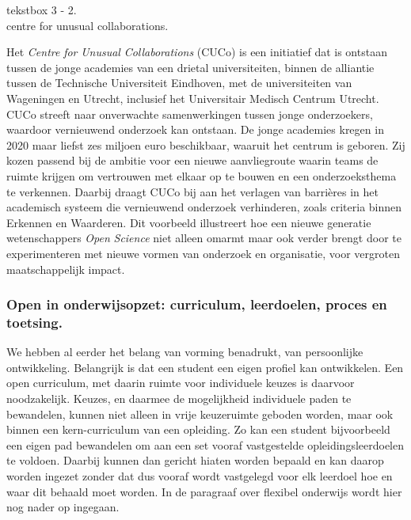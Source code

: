 \documentclass[empirical, authordate, ]{new-jote-article}
\begin{document}
	\begin{bookbox}{\raggedright tekstbox 3 - 2. \\centre for unusual collaborations.}
		Het \emph{Centre }\emph{for}\emph{ }\emph{Unusual}\emph{ }\emph{Collaborations} (CUCo) is een initiatief dat is ontstaan tussen de jonge academies van een drietal universiteiten, binnen de alliantie tussen de Technische Universiteit Eindhoven, met de universiteiten van Wageningen en Utrecht, inclusief het Universitair Medisch Centrum Utrecht. CUCo streeft naar onverwachte samenwerkingen tussen jonge onderzoekers, waardoor vernieuwend onderzoek kan ontstaan. De jonge academies kregen in 2020 maar liefst zes miljoen euro beschikbaar, waaruit het centrum is geboren. Zij kozen passend bij de ambitie voor een nieuwe aanvliegroute waarin teams de ruimte krijgen om vertrouwen met elkaar op te bouwen en een onderzoeksthema te verkennen. Daarbij draagt CUCo bij aan het verlagen van barrières in het academisch systeem die vernieuwend onderzoek verhinderen, zoals criteria binnen Erkennen en Waarderen. Dit voorbeeld illustreert hoe een nieuwe generatie wetenschappers \emph{Open }\emph{Science} niet alleen omarmt maar ook verder brengt door te experimenteren met nieuwe vormen van onderzoek en organisatie, voor vergroten maatschappelijk impact.
	\end{bookbox}

	\subsubsection{Open in onderwijsopzet: curriculum, leerdoelen, proces en toetsing. }



	We hebben al eerder het belang van vorming benadrukt, van persoonlijke ontwikkeling. Belangrijk is dat een student een eigen profiel kan ontwikkelen. Een open curriculum, met daarin ruimte voor individuele keuzes is daarvoor noodzakelijk. Keuzes, en daarmee de mogelijkheid individuele paden te bewandelen, kunnen niet alleen in vrije keuzeruimte geboden worden, maar ook binnen een kern-curriculum van een opleiding. Zo kan een student bijvoorbeeld een eigen pad bewandelen om aan een set vooraf vastgestelde opleidingsleerdoelen te voldoen. Daarbij kunnen dan gericht hiaten worden bepaald en kan daarop worden ingezet zonder dat dus vooraf wordt vastgelegd voor elk leerdoel hoe en waar dit behaald moet worden. In de paragraaf over flexibel onderwijs wordt hier nog nader op ingegaan.
\end{document}
